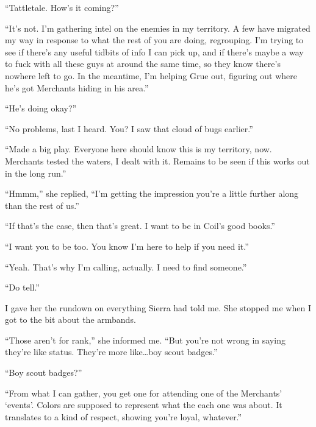 ``Tattletale.  How's it coming?''



``It's not.  I'm gathering intel on the enemies in my territory.  A few have migrated my way in response to what the rest of you are doing, regrouping.  I'm trying to see if there's any useful tidbits of info I can pick up, and if there's maybe a way to fuck with all these guys at around the same time, so they know there's nowhere left to go.  In the meantime, I'm helping Grue out, figuring out where he's got Merchants hiding in his area.''



``He's doing okay?''



``No problems, last I heard.  You?  I saw that cloud of bugs earlier.''



``Made a big play.  Everyone here should know this is my territory, now.  Merchants tested the waters, I dealt with it.  Remains to be seen if this works out in the long run.''



``Hmmm,'' she replied, ``I'm getting the impression you're a little further along than the rest of us.''



``If that's the case, then that's great.  I want to be in Coil's good books.''



``I want you to be too.  You know I'm here to help if you need it.''



``Yeah.  That's why I'm calling, actually.  I need to find someone.''



``Do tell.''



I gave her the rundown on everything Sierra had told me.  She stopped me when I got to the bit about the armbands.



``Those aren't for rank,'' she informed me.  ``But you're not wrong in saying they're like status.  They're more like\ldots boy scout badges.''



``Boy scout badges?''



``From what I can gather, you get one for attending one of the Merchants' `events'.  Colors are supposed to represent what the each one was about.  It translates to a kind of respect, showing you're loyal, whatever.''



